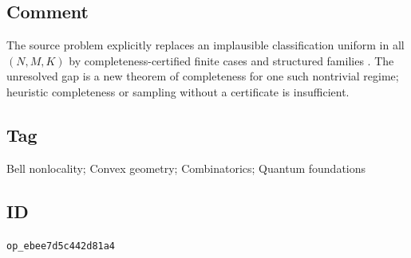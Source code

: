\subsection*{Comment}

The source problem explicitly replaces an implausible classification uniform
in all $(N,M,K)$ by completeness-certified finite cases and structured
families .  The unresolved gap is a
new theorem of completeness for one such nontrivial regime; heuristic
completeness or sampling without a certificate is insufficient.

\subsection*{Tag}

Bell nonlocality; Convex geometry; Combinatorics; Quantum foundations

\subsection*{ID}

\texttt{op\_ebee7d5c442d81a4}
